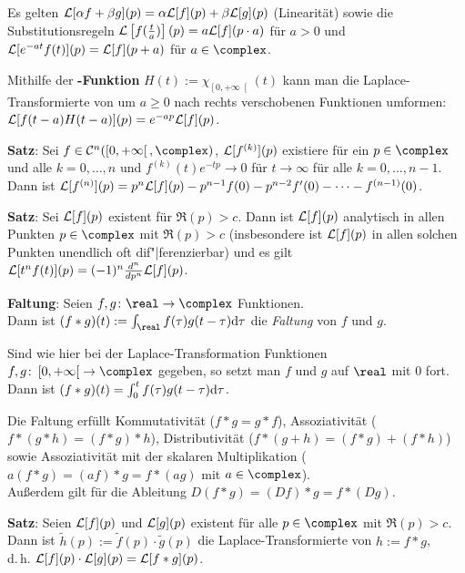 Es gelten
$\mathcal{L}[\alpha f + \beta g](p) = \alpha \mathcal{L}[f](p) + \beta \mathcal{L}[g](p)$
(Linearität) sowie die Substitutionsregeln
$\mathcal{L}\left[f(\frac{t}{a})\right](p) = a \mathcal{L}[f](p \cdot a)$ für $a > 0$
und $\mathcal{L}[e^{-at}f(t)](p) = \mathcal{L}[f](p + a)$ für $a \in \complex$.

Mithilfe der \textbf{-Funktion}
$H(t) := \chi_{\left[0, +\infty\right[}(t)$
kann man die Laplace-Transformierte von um $a \ge 0$ nach rechts verschobenen
Funktionen umformen: \\
$\mathcal{L}[f(t - a) H(t - a)](p) = e^{-ap} \mathcal{L}[f](p)$.

\linie

\textbf{Satz}:
Sei $f \in \C^n(\left[0, +\infty\right[, \complex)$,
$\mathcal{L}[f^{(k)}](p)$ existiere für ein $p \in \complex$ und
alle $k = 0, \dotsc, n$ und
$f^{(k)}(t) e^{-tp} \to 0$ für $t \to \infty$
für alle $k = 0, \dotsc, n - 1$. \\
Dann ist $\mathcal{L}[f^{(n)}](p) = p^n \mathcal{L}[f](p) - p^{n-1} f(0) - p^{n-2} f'(0) -
\dotsb - f^{(n-1)}(0)$.

\textbf{Satz}:
Sei $\mathcal{L}[f](p)$ existent für $\Re(p) > c$.
Dann ist $\mathcal{L}[f](p)$ analytisch in allen Punkten $p \in \complex$ mit
$\Re(p) > c$ (insbesondere ist $\mathcal{L}[f](p)$ in allen solchen Punkten
unendlich oft dif"|ferenzierbar) und es gilt
$\mathcal{L}[t^n f(t)](p) = (-1)^n \frac{d^n}{dp^n} \mathcal{L}[f](p)$.

\linie

\textbf{Faltung}:
Seien $f, g\colon \real \rightarrow \complex$ Funktionen. \\
Dann ist $(f \ast g)(t) := \int_\real f(\tau) g(t - \tau) \d\tau$
die \emph{Faltung} von $f$ und $g$.

Sind wie hier bei der Laplace-Transformation Funktionen
$f, g\colon \left[0, +\infty\right[ \rightarrow \complex$ gegeben,
so setzt man $f$ und $g$ auf $\real$ mit $0$ fort.
Dann ist $(f \ast g)(t) = \int_0^t f(\tau) g(t - \tau) \mathrm{d}\tau$.

Die Faltung erfüllt Kommutativität ($f \ast g = g \ast f$),
Assoziativität ($f \ast (g \ast h) = (f \ast g) \ast h$),
Distributivität ($f \ast (g + h) = (f \ast g) + (f \ast h)$) sowie
Assoziativität mit der skalaren Multiplikation
($a(f \ast g) = (af) \ast g = f \ast (ag)$ mit $a \in \complex$). \\
Außerdem gilt für die Ableitung
$D(f \ast g) = (Df) \ast g = f \ast (Dg)$.

\textbf{Satz}:
Seien $\mathcal{L}[f](p)$ und $\mathcal{L}[g](p)$ existent für alle $p \in \complex$ mit
$\Re(p) > c$. \\
Dann ist $\widetilde{h}(p) := \widetilde{f}(p) \cdot \widetilde{g}(p)$ die
Laplace-Transformierte von $h := f \ast g$, \\
d.\,h. $\mathcal{L}[f](p) \cdot \mathcal{L}[g](p) = \mathcal{L}[f \ast g](p)$.

